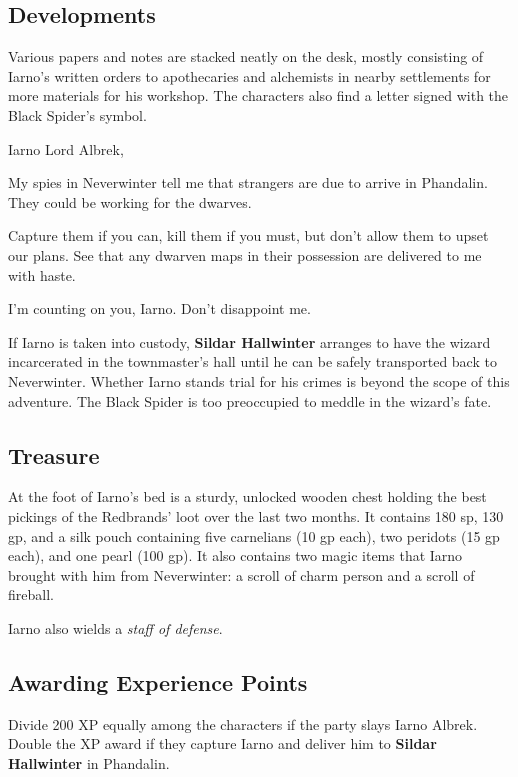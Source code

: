 \documentclass[10pt,a4paper,twoside,bg=print,twocolumn,openany,nodeprecatedcode]{dndbook}
\begin{document}
\subsection{Developments}
Various papers and notes are stacked neatly on the desk, mostly consisting of Iarno's written orders to apothecaries and alchemists in nearby settlements for more materials for his workshop. The characters also find a letter signed with the Black Spider's symbol.

\begin{DndSidebar}[float=!b]{Iarno}
Lord Albrek,



My spies in Neverwinter tell me that strangers are due to arrive in Phandalin. They could be working for the dwarves.



Capture them if you can, kill them if you must, but don't allow them to upset our plans. See that any dwarven maps in their possession are delivered to me with haste.



I'm counting on you, Iarno. Don't disappoint me.



\end{DndSidebar}

If Iarno is taken into custody, \textbf{Sildar Hallwinter} arranges to have the wizard incarcerated in the townmaster's hall until he can be safely transported back to Neverwinter. Whether Iarno stands trial for his crimes is beyond the scope of this adventure. The Black Spider is too preoccupied to meddle in the wizard's fate.

\subsection{Treasure}
At the foot of Iarno's bed is a sturdy, unlocked wooden chest holding the best pickings of the Redbrands' loot over the last two months. It contains 180 sp, 130 gp, and a silk pouch containing five carnelians (10 gp each), two peridots (15 gp each), and one pearl (100 gp). It also contains two magic items that Iarno brought with him from Neverwinter: a scroll of charm person and a scroll of fireball.

Iarno also wields a \textit{staff of defense}.

\subsection{Awarding Experience Points}
Divide 200 XP equally among the characters if the party slays Iarno Albrek. Double the XP award if they capture Iarno and deliver him to \textbf{Sildar Hallwinter} in Phandalin.
\end{document}
